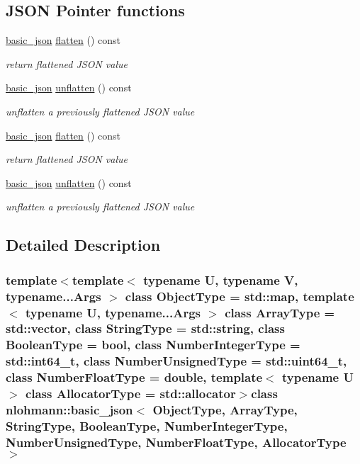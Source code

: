 \subsection*{J\-S\-O\-N Pointer functions}
\begin{DoxyCompactItemize}
\item 
\hyperlink{classnlohmann_1_1basic__json}{basic\-\_\-json} \hyperlink{classnlohmann_1_1basic__json_a5327abb014dec211593b00959830650e}{flatten} () const 
\begin{DoxyCompactList}\small\item\em return flattened J\-S\-O\-N value \end{DoxyCompactList}\item 
\hyperlink{classnlohmann_1_1basic__json}{basic\-\_\-json} \hyperlink{classnlohmann_1_1basic__json_a0389c5dd86adc512e5826d7ff610f776}{unflatten} () const 
\begin{DoxyCompactList}\small\item\em unflatten a previously flattened J\-S\-O\-N value \end{DoxyCompactList}\item 
\hyperlink{classnlohmann_1_1basic__json}{basic\-\_\-json} \hyperlink{classnlohmann_1_1basic__json_a5327abb014dec211593b00959830650e}{flatten} () const 
\begin{DoxyCompactList}\small\item\em return flattened J\-S\-O\-N value \end{DoxyCompactList}\item 
\hyperlink{classnlohmann_1_1basic__json}{basic\-\_\-json} \hyperlink{classnlohmann_1_1basic__json_a0389c5dd86adc512e5826d7ff610f776}{unflatten} () const 
\begin{DoxyCompactList}\small\item\em unflatten a previously flattened J\-S\-O\-N value \end{DoxyCompactList}\end{DoxyCompactItemize}


\subsection{Detailed Description}
\subsubsection*{template$<$template$<$ typename U, typename V, typename...\-Args $>$ class Object\-Type = std\-::map, template$<$ typename U, typename...\-Args $>$ class Array\-Type = std\-::vector, class String\-Type = std\-::string, class Boolean\-Type = bool, class Number\-Integer\-Type = std\-::int64\-\_\-t, class Number\-Unsigned\-Type = std\-::uint64\-\_\-t, class Number\-Float\-Type = double, template$<$ typename U $>$ class Allocator\-Type = std\-::allocator$>$class nlohmann\-::basic\-\_\-json$<$ Object\-Type, Array\-Type, String\-Type, Boolean\-Type, Number\-Integer\-Type, Number\-Unsigned\-Type, Number\-Float\-Type, Allocator\-Type $>$}

